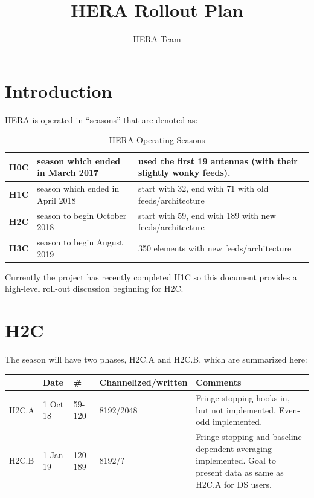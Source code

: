 \documentclass{article}
\begin{document}
\author{HERA Team}
\title{HERA Rollout Plan}
\maketitle

\setcounter{section}{-1}
\section{Introduction}
HERA is operated in ``seasons'' that are denoted as:

\begin{table}[H]
\caption{HERA Operating Seasons}
\begin{tabular}{p{0.5in} p{2.2in} p{3.5in}} \hline
{\bf H0C} & season which ended in March 2017 & used the first 19 antennas (with their slightly wonky feeds). \\ \hline
{\bf H1C} & season which ended in April 2018 & start with 32, end with 71 with old feeds/architecture\\ \hline
{\bf H2C} & season to begin October 2018 & start with 59, end with 189 with new feeds/architecture\\ \hline
{\bf H3C} & season to begin August 2019 & 350 elements with new feeds/architecture \\ \hline
\end{tabular}
\end{table}

Currently the project has recently completed H1C so this document provides a high-level roll-out discussion beginning for H2C.


\section{H2C}
The season will have two phases, H2C.A and H2C.B, which are summarized here:

\vspace{0.5cm}
\begin{tabular}{l l l l p{2.5in}}
 & \textbf{Date} & \textbf{\#} & \textbf{Channelized/written} & \textbf{Comments} \\ \hline
H2C.A & 1 Oct 18 & 59-120 & 8192/2048 & Fringe-stopping hooks in, but not implemented.  Even-odd implemented. \\ \hline
H2C.B & 1 Jan 19 & 120-189 & 8192/? & Fringe-stopping and baseline-dependent averaging implemented.  Goal to present data as same as H2C.A for DS users. \\ \hline
\end{tabular}
\vspace{1cm}
\end{document}
